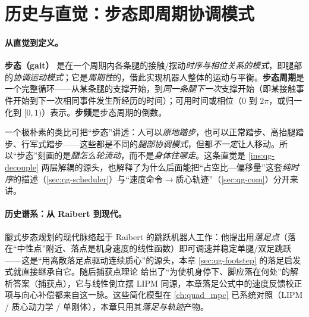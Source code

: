 \section{历史与直觉：步态即周期协调模式}
\label{sec:qg-history}

\paragraph{从直觉到定义。}
\textbf{步态（gait）} 是在一个周期内各条腿的接触/摆动\emph{时序与相位关系的模式}，即腿部的\emph{协调运动模式}；它是\emph{周期性}的，借此实现机器人整体的运动与平衡\cite{unitree2023quadruped}。\textbf{步态周期}是一个完整循环——从某条腿的支撑开始，到\emph{同一条腿下一次}支撑开始（即某接触事件开始到下一次相同事件发生所经历的时间）；可用时间或相位（$0$ 到 $2\pi$，或归一化到 $[0,1)$）表示。\textbf{步频}是步态周期的倒数。

\begin{insight}[踏步类比：步态!=移动]\label{ins:qg-treadmill}
一个极朴素的类比可把“步态”讲透：人可以\emph{原地踏步}，也可以正常踏步、高抬腿踏步、行军式踏步——这些都是不同的\emph{腿部协调模式}，但都\emph{不一定}让人移动。所以“步态”刻画的是\emph{腿怎么轮流动}，而不是\emph{身体往哪走}。这条直觉是 \cref{ins:qg-decouple} 两层解耦的源头，也解释了为什么后面能把“占空比—偏移量”这套\emph{纯时序}的描述（\cref{sec:qg-scheduler}）与“速度命令$\to$质心轨迹”（\cref{sec:qg-com}）分开来讲。
\end{insight}

\paragraph{历史谱系：从 Raibert 到现代。}
腿式步态规划的现代脉络起于 Raibert 的跳跃机器人工作\cite{raibert1986legged}：他提出用\emph{落足点}（落在“中性点”附近、落点是机身速度的线性函数）即可调速并稳定单腿/双足跳跃——这是“用离散落足点驱动连续质心”的源头，本章 \cref{sec:qg-footstep} 的落足启发式就直接继承自它。随后捕获点理论\cite{pratt2006capture} 给出了“为使机身停下、脚应落在何处”的解析答案（捕获点），它与线性倒立摆 LIPM\cite{kajita2001lipm} 同源，本章落足公式中的速度反馈校正项与向心补偿都来自这一脉。这些简化模型在 \cref{ch:quad_mpc} 已系统对照（LIPM / 质心动力学 / 单刚体），本章只用其\emph{落足与轨迹}产物。

